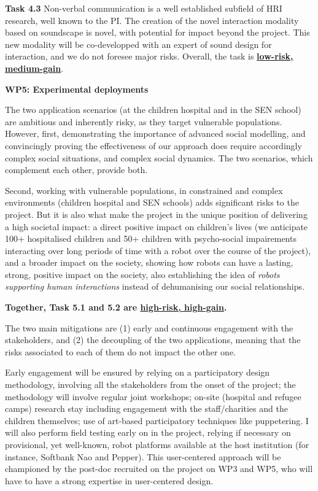\documentclass[11pt,a4paper]{report}
\begin{document}
\textbf{Task 4.3} Non-verbal communication is a well established subfield of HRI
research, well known to the PI. The creation of the novel interaction modality
based on soundscape is novel, with potential for impact beyond the project. This
new modality will be co-developped with an expert of sound design for
interaction, and we do not foresee major risks. Overall, the task is \ul{\bf
low-risk, medium-gain}.

\vspace{1em}

\textbf{WP5: Experimental deployments}

The two application scenarios (at the children hospital and in the SEN school)
are ambitious and inherently risky, as they target vulnerable populations.
However, first, demonstrating the importance of advanced social modelling, and
convincingly proving the effectiveness of our approach does require accordingly
complex social situations, and complex social dynamics. The two scenarios, which
complement each other, provide both.

Second, working with vulnerable populations, in constrained and complex
environments (children hospital and SEN schools) adds significant risks to the
project. But it is also what make the project in the unique position of
delivering a high societal impact: a direct positive impact on children's lives
(we anticipate 100+ hospitalised children and 50+ children with psycho-social
impairements interacting over long periods of time with a robot over the course
of the project), and a broader impact on the society, showing how robots can
have a lasting, strong, positive impact on the society, also establishing the
idea of \emph{robots supporting human interactions} instead of dehumanising our
social relationships.

\textbf{Together, Task 5.1 and 5.2 are \ul{high-risk, high-gain}.}

The two main mitigations are (1) early and continuous engagement with the
stakeholders, and (2) the decoupling of the two applications, meaning that the
risks associated to each of them do not impact the other one.

Early engagement will be ensured by relying on a participatory design
methodology, involving all the stakeholders from the onset of the project; the
methodology will involve regular joint workshops; on-site (hospital and refugee
camps) research stay including engagement with the staff/charities and the
children themselves; use of art-based participatory techniques like puppetering.
I will also perform field testing early on in the project, relying if necessary
on provisional, yet well-known, robot platforms available at the host
institution (for instance, Softbank Nao and Pepper). This user-centered approach
will be championed by the post-doc recruited on the project on WP3 and WP5, who will
have to have a strong expertise in user-centered design.
\end{document}
